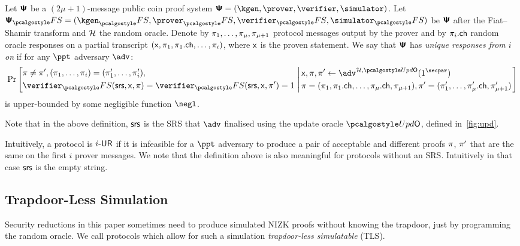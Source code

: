 \begin{definition}
	\label{def:wiuru}
	Let $\bm{\mathsf{\Psi}}$ be a $(2\mu + 1)$-message public coin proof system
  $\ps = (\kgen, \prover, \verifier, \simulator)$. Let
  $\proofsystem_\fs = (\kgen_\fs, \prover_\fs, \verifier_\fs, \simulator_\fs)$ be
  $\bm{\mathsf{\Psi}}$ after the Fiat--Shamir transform and $\mathcal{H}$ the random oracle. Denote
  by $\pi_1, \ldots, \pi_{\mu}, \pi_{\mu + 1}$ protocol messages
  output by the prover and by $\pi_i.\mathsf{ch}$ random oracle responses on a partial
  transcript
  $(\mathsf{x}, \pi_1, \pi_1.\mathsf{ch}, \ldots, \pi_i)$,
  where $\mathsf{x}$ is the proven statement. We say that $\bm{\mathsf{\Psi}}$ has \emph{unique
    responses from $i$ on} if for any $\ppt$ adversary $\adv$:
  \[
	\Pr\left[
	\begin{aligned}
	& \zkproof \neq \zkproof', (\zkproof_1, \ldots, \zkproof_{i}) = (\zkproof'_1,
	\ldots, \zkproof'_{i}), \\
	& \verifier_\fs (\srs, \inp, \zkproof) =
	\verifier_\fs(\srs, \inp, \zkproof') = 1  \\
	\end{aligned}
	\,\left|\,
	\begin{aligned}
	& \inp, \zkproof, \zkproof'  \gets \adv^{\ro, \initU}(1^\secpar) \\
& \zkproof = (\zkproof_1, \zkproof_1.\ch, \ldots, \zkproof_{\mu}.\ch, \zkproof_{\mu + 1}), \zkproof' = (\zkproof'_1, \ldots,
	\zkproof'_{\mu}.\ch, \zkproof'_{\mu + 1})
	\end{aligned}
	\right.\right]
	\]
	is upper-bounded by some negligible function $\negl$.
\end{definition}
%
Note that in the above definition, $\mathsf{srs}$ is the SRS that $\advse$ finalised using
the update oracle $\initU$, defined in~\cref{fig:upd}.

Intuitively, a protocol is ${i\text{-}\mathsf{UR}}$ if it is infeasible for a $\ppt$ adversary to
produce a pair of acceptable and different proofs $\pi$, $\pi'$ that are
the same on the first $i$ prover messages.  We note that the definition above is also
meaningful for protocols without an SRS. Intuitively in that case $\mathsf{srs}$ is the empty
string.

 \subsection{Trapdoor-Less Simulation}
 Security reductions in this paper sometimes need to produce simulated NIZK proofs without
 knowing the trapdoor, just by programming the random oracle. We call protocols which
 allow for such a simulation \emph{trapdoor-less simulatable} (TLS).

